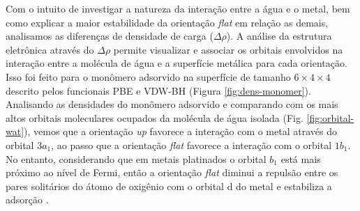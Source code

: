 Com o intuito de investigar a natureza da interação entre a água e o metal, bem como explicar a maior estabilidade da orientação \textit{flat} em relação as demais, analisamos as diferenças de densidade de carga ($\Delta\rho$). A análise da estrutura eletrônica através do $\Delta\rho$ permite visualizar e associar os orbitais envolvidos na interação entre a molécula de água e a superfície metálica para cada orientação. Isso foi feito para o monômero adsorvido na superfície de tamanho $6\times4\times4$ descrito pelos funcionais PBE e VDW-BH (Figura \ref{fig:dens-monomer}). Analisando as densidades do monômero adsorvido e comparando com os mais altos orbitais moleculares ocupados da molécula de água isolada (Fig. \ref{fig:orbital-wat}), vemos que a orientação \textit{up} favorece a interação com o metal através do orbital $3a_1$, ao passo que a orientação \textit{flat} favorece a interação com o orbital $1b_1$.  No entanto, considerando que em metais platinados o orbital $b_1$ está mais próximo ao nível de Fermi, então a orientação \textit{flat} diminui a repulsão entre os pares solitários do átomo de oxigênio com o orbital d do metal e estabiliza a adsorção \cite{michaedelis,monomer}.
